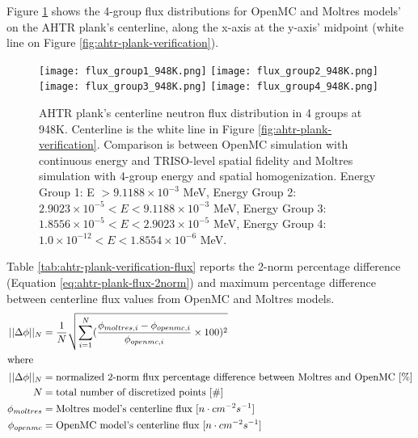 Figure \ref{fig:flux_948K} shows the 4-group flux distributions for OpenMC and 
Moltres models' on the \gls{AHTR} plank's centerline, along the x-axis at the y-axis' 
midpoint (white line on Figure \ref{fig:ahtr-plank-verification}). 
\begin{figure}[htbp]
    \centering
    \texttt{[image: flux\_group1\_948K.png]} 
    \texttt{[image: flux\_group2\_948K.png]} 
    \texttt{[image: flux\_group3\_948K.png]} 
    \texttt{[image: flux\_group4\_948K.png]} 
    \caption{\acrfull{AHTR} plank's centerline neutron flux distribution 
    in 4 groups at 948K. 
    Centerline is the white line in Figure \ref{fig:ahtr-plank-verification}.
    Comparison is between OpenMC simulation with continuous energy 
    and TRISO-level spatial fidelity and Moltres simulation with 4-group energy and 
    spatial homogenization.  
    Energy Group 1: E $> 9.1188 \times 10^{-3}$ MeV, 
    Energy Group 2: $2.9023 \times 10^{-5} < E < 9.1188 \times 10^{-3}$ MeV,
    Energy Group 3:  $1.8556 \times 10^{-5} < E < 2.9023 \times 10^{-5}$ MeV,
    Energy Group 4:  $1.0 \times 10^{-12} < E < 1.8554 \times 10^{-6}$ MeV.}
    \label{fig:flux_948K}
\end{figure}
Table \ref{tab:ahtr-plank-verification-flux} reports the 2-norm percentage difference 
(Equation \ref{eq:ahtr-plank-flux-2norm}) and maximum percentage difference between 
centerline flux values from OpenMC and Moltres models. 
\begin{align}
    \label{eq:ahtr-plank-flux-2norm}
    ||\Delta \phi||_N &= \frac{1}{N}\sqrt{\sum_{i=1}^N(\frac{\phi_{moltres, i} - \phi_{openmc, i}}{\phi_{openmc, i}}\times100)^2} \\
\intertext{where}
    ||\Delta \phi||_N &= \mbox{normalized 2-norm flux percentage difference between Moltres and OpenMC } [\%] \nonumber \\
    N &= \mbox{total number of discretized points } [\#] \nonumber \\
    \phi_{moltres} &= \mbox{Moltres model's centerline flux } [n \cdot cm^{-2}s^{-1}] \nonumber \\
    \phi_{openmc} &= \mbox{OpenMC model's centerline flux } [n \cdot cm^{-2}s^{-1}] \nonumber 
\end{align} 
